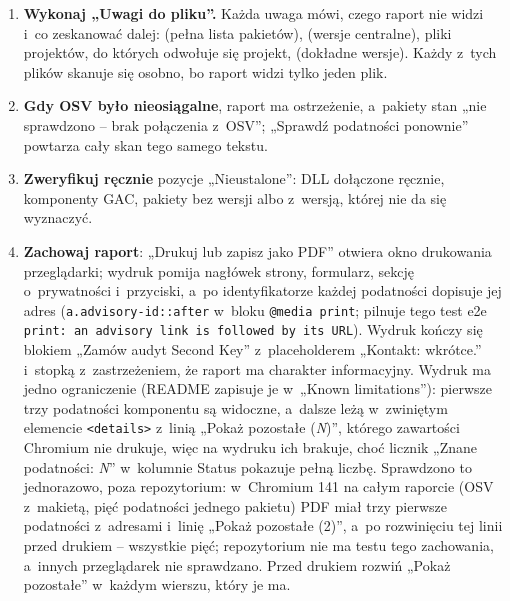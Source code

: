 \begin{enumerate}
        statusu, wersję (przy ograniczeniu -- najniższą dopuszczalną), koniec wsparcia,
        podatności i~notatki pod nazwą (sekcja~\ref{sec:risk-scan-raport}).
  \item \textbf{Wykonaj „Uwagi do pliku”.} Każda uwaga mówi, czego raport nie widzi i~co
        zeskanować dalej:  (pełna lista pakietów),
         (wersje centralne), pliki 
        projektów, do których odwołuje się projekt,  (dokładne
        wersje). Każdy z~tych plików skanuje się osobno, bo raport widzi tylko jeden plik.
  \item \textbf{Gdy OSV było nieosiągalne}, raport ma ostrzeżenie, a~pakiety stan „nie
        sprawdzono -- brak połączenia z~OSV”; „Sprawdź podatności ponownie” powtarza cały
        skan tego samego tekstu.
  \item \textbf{Zweryfikuj ręcznie} pozycje „Nieustalone”: DLL dołączone ręcznie, komponenty
        GAC, pakiety bez wersji albo z~wersją, której nie da się wyznaczyć.
  \item \textbf{Zachowaj raport}: „Drukuj lub zapisz jako PDF” otwiera okno drukowania
        przeglądarki; wydruk pomija nagłówek strony, formularz, sekcję o~prywatności
        i~przyciski, a~po identyfikatorze każdej podatności dopisuje jej adres
        (\texttt{a.advisory-id::after} w~bloku \texttt{@media print}; pilnuje tego test e2e
        \texttt{print: an advisory link is followed by its URL}). Wydruk kończy się blokiem
        „Zamów audyt Second Key” z~placeholderem „Kontakt: wkrótce.” i~stopką z~zastrzeżeniem, że
        raport ma charakter informacyjny. Wydruk ma jedno ograniczenie (README zapisuje je w~„Known
        limitations”): pierwsze trzy podatności komponentu są widoczne, a~dalsze leżą w~zwiniętym elemencie
        \texttt{<details>} z~linią „Pokaż pozostałe (\emph{N})”, którego zawartości Chromium nie
        drukuje, więc na wydruku ich brakuje, choć licznik „Znane podatności: \emph{N}” w~kolumnie
        Status pokazuje pełną liczbę. Sprawdzono to jednorazowo, poza repozytorium: w~Chromium 141
        na całym raporcie (OSV z~makietą, pięć podatności jednego pakietu) PDF miał trzy
        pierwsze podatności z~adresami i~linię „Pokaż pozostałe (2)”, a~po rozwinięciu tej linii
        przed drukiem -- wszystkie pięć; repozytorium nie ma testu tego zachowania, a~innych
        przeglądarek nie sprawdzano. Przed drukiem rozwiń „Pokaż pozostałe” w~każdym wierszu,
        który je ma.
\end{enumerate}

